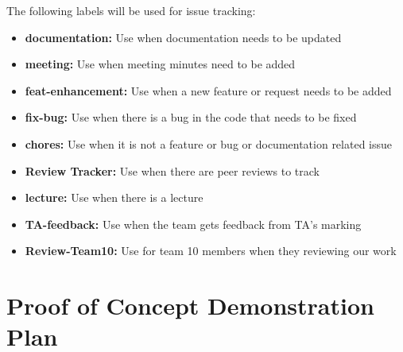 \documentclass{article}
\begin{document}
The following labels will be used for issue tracking:
\begin{itemize}
    \item \textbf{documentation:} Use when documentation needs to be updated
    \item \textbf{meeting:} Use when meeting minutes need to be added
    \item \textbf{feat-enhancement:} Use when a new feature or request needs to be added
    \item \textbf{fix-bug:} Use when there is a bug in the code that needs to be fixed
    \item \textbf{chores:} Use when it is not a feature or bug or documentation related issue
    \item \textbf{Review Tracker:} Use when there are peer reviews to track
    \item \textbf{lecture:} Use when there is a lecture
    \item \textbf{TA-feedback:} Use when the team gets feedback from TA's marking
    \item \textbf{Review-Team10:} Use for team 10 members when they reviewing our work
\end{itemize}

\section{Proof of Concept Demonstration Plan}
\end{document}
